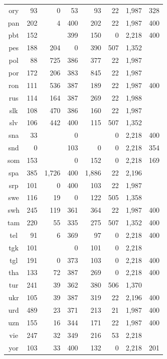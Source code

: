 \begin{table}[!htb]
\begin{minipage}[t]{0.45\textwidth}
\begin{tabular}{@{}crrrrrrr@{}}
        ory & 93 & 0 & 53 & 93 & 22 & 1,987 & 328 \\
        pan & 202 & 4 & 400 & 202 & 22 & 1,987 & 400 \\
        pbt & 152 &  & 399 & 150 & 0 & 2,218 & 400 \\
        pes & 188 & 204 & 0 & 390 & 507 & 1,352 &  \\
        pol & 88 & 725 & 386 & 377 & 22 & 1,987 &  \\
        por & 172 & 206 & 383 & 845 & 22 & 1,987 &  \\
        ron & 111 & 536 & 387 & 189 & 22 & 1,987 & 400 \\
        rus & 114 & 164 & 387 & 269 & 22 & 1,988 &  \\
        slk & 108 & 470 & 386 & 160 & 22 & 1,987 &  \\
        slv & 106 & 442 & 400 & 115 & 507 & 1,352 &  \\
        sna & 33 &  & 0 &  & 0 & 2,218 & 400 \\
        snd & 0 &  & 103 & 0 & 0 & 2,218 & 354 \\
        som & 153 &  & 0 & 152 & 0 & 2,218 & 169 \\
        spa & 385 & 1,726 & 400 & 1,886 & 22 & 2,196 &  \\
        srp & 101 & 0 & 400 & 103 & 22 & 1,987 &  \\
        swe & 116 & 19 & 0 & 122 & 505 & 1,358 &  \\
        swh & 245 & 119 & 361 & 364 & 22 & 1,987 & 400 \\
        tam & 220 & 55 & 335 & 275 & 507 & 1,352 & 400 \\
        tel & 91 & 6 & 369 & 97 & 0 & 2,218 & 400 \\
        tgk & 101 &  & 0 & 101 & 0 & 2,218 &  \\
        tgl & 191 & 0 & 373 & 103 & 0 & 2,218 & 400 \\
        tha & 133 & 72 & 387 & 269 & 0 & 2,218 & 400 \\
        tur & 241 & 39 & 362 & 380 & 506 & 1,370 &  \\
        ukr & 105 & 39 & 387 & 319 & 22 & 2,196 & 400 \\
        urd & 489 & 23 & 371 & 213 & 21 & 1,987 & 400 \\
        uzn & 155 & 16 & 344 & 171 & 22 & 1,987 & 400 \\
        vie & 247 & 32 & 349 & 216 & 53 & 2,218 &  \\
        yor & 103 & 33 & 400 & 132 & 0 & 2,218 & 201 \\

\end{tabular}
\end{minipage}
\end{table}
